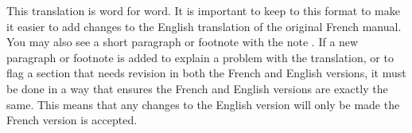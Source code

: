 
This translation is word for word. It is important to keep to this format to make it easier to add changes to the English translation of the original French manual.  You may also see a short paragraph or footnote with the note . If a new paragraph or footnote is added to explain a problem with the translation, or to flag a section that needs revision in both the French and English versions, it must be done in a way that ensures the French and English versions are exactly the same. This means that any changes to the English version will only be made  the French version is accepted.





